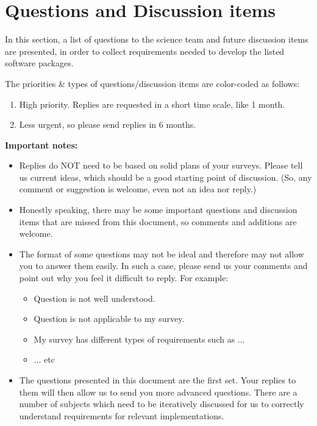 \documentclass[a4paper,notitlepage]{article}
\begin{document}
\section{Questions and Discussion items}

In this section, a list of questions to the science team and future
discussion items are presented, in order to collect requirements needed
to develop the listed software packages.

The priorities \& types of questions/discussion items are color-coded as
follows:
\begin{enumerate}
  \item[\colm{x}] High priority. Replies are requested in a short time
           scale, like 1 month.
  \item[\colm{x}] Less urgent, so please send replies in 6 months.
\end{enumerate}

{\bf Important notes:}
\begin{itemize}
 \item Replies do NOT need to be based on solid plans of your
   surveys. Please tell us current ideas, which should be a good
   starting point of discussion.
       (So, any comment or suggestion is welcome, even not an idea nor reply.) 
 \item Honestly speaking, there may be some important questions and
       discussion items that are missed from this document, so comments
       and additions are welcome.
 \item The format of some questions may not be ideal and therefore may
       not allow you to answer them easily. In such a case, please send
       us your comments and point out why you feel it difficult to
       reply. For example:
       \begin{itemize}
    \item Question is not well understood.
    \item Question is not applicable to my survey.
    \item My survey has different types of requirements such as ... 
    \item ... etc
       \end{itemize}
 \item The questions presented in this document are the first
   set. Your replies to them will then allow us to send you more
   advanced questions. There are a number of subjects which need to be
   iteratively discussed for us to correctly understand requirements
   for relevant implementations.
\end{itemize}
\end{document}
